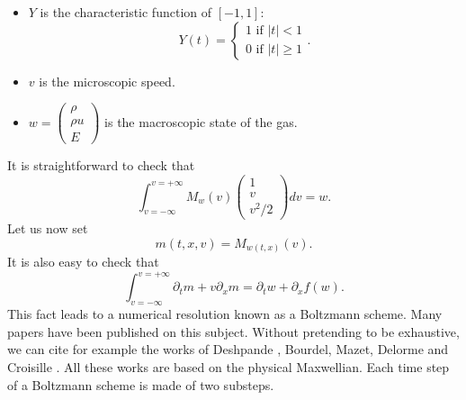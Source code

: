 \documentclass{fldauth}
\theoremstyle{plain}
\theoremstyle{plain}
\theoremstyle{plain}
\theoremstyle{plain}
\theoremstyle{plain}
\theoremstyle{plain}
\begin{document}
\begin{itemize}
\item \( Y \) is the characteristic function of \( [-1,1] \):
\[
Y(t)=\left\{ \begin{array}{c}
1\textrm{ if }\left| t\right| <1\\
0\textrm{ if }\left| t\right| \geq 1
\end{array}\right. .\]

\item \( v \) is the microscopic speed.
\item \( w=\left( \begin{array}{c}
\rho \\
\rho u\\
E
\end{array}\right)  \) is the macroscopic state of the gas.
\end{itemize}
It is straightforward to check that
\[
\int _{v=-\infty }^{v=+\infty }M_{w}(v)\left( \begin{array}{c}
1\\
v\\
v^{2}/2
\end{array}\right) dv=w.\]
 Let us now set
\[
m(t,x,v)=M_{w(t,x)}(v).\]
 It is also easy to check that
\begin{equation}
\label{eulboltz} \int _{v=-\infty }^{v=+\infty }\partial
_{t}m+v\partial _{x}m=\partial _{t}w+\partial _{x}f(w).
\end{equation}
 This fact leads to a numerical resolution known as a Boltzmann scheme.
 Many papers have been published on this subject.
Without pretending to be exhaustive, we can cite for example the
works of Deshpande \cite{deshpande88}, Bourdel, Mazet, Delorme and
Croisille \cite{mazet89}. All these works are based on the
physical Maxwellian. Each time step of a Boltzmann scheme is made
of two substeps.
\end{document}
